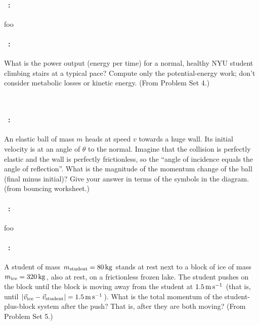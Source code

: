 \documentclass[12pt]{article} 
\begin{document}
\vfill

\paragraph{\problemname~\theproblem:}%
foo

\vfill

\paragraph{\problemname~\theproblem:}%
What is the power output (energy per time) for a normal, healthy NYU
student climbing stairs at a typical pace? Compute only the
potential-energy work; don't consider metabolic losses or kinetic
energy.
(From Problem Set 4.)

\vfill
~
\clearpage

\paragraph{\problemname~\theproblem:}%
An elastic ball of mass $m$ heads at speed $v$ towards a huge wall.
Its initial velocity is at an angle of $\theta$ to the normal.
Imagine that the collision is perfectly elastic and the
wall is perfectly frictionless, so the ``angle of incidence equals the
angle of reflection''. What is the magnitude of the momentum change of the ball (final
minus initial)?
Give your answer in terms of the symbols in the diagram.
(from bouncing worksheet.)

\vfill

\paragraph{\problemname~\theproblem:}%
foo

\vfill

\paragraph{\problemname~\theproblem:}%
A student of mass $m_\mathrm{student}=80\,\mathrm{kg}$ stands at rest next to
a block of ice of mass $m_\mathrm{ice}=320\,\mathrm{kg}$, also at rest, on a
frictionless frozen lake.  The student pushes on the block until the
block is moving away from the student at $1.5\,\mathrm{m}\,\mathrm{s}^{-1}$ (that is, until
$\left|\vec{v}_\mathrm{ice}-\vec{v}_\mathrm{student}\right|=1.5\,\mathrm{m}\,\mathrm{s}^{-1}$).
What is the total momentum of the student-plus-block system after the
push? That is, after they are both moving?
(From Problem Set 5.)
\end{document}
